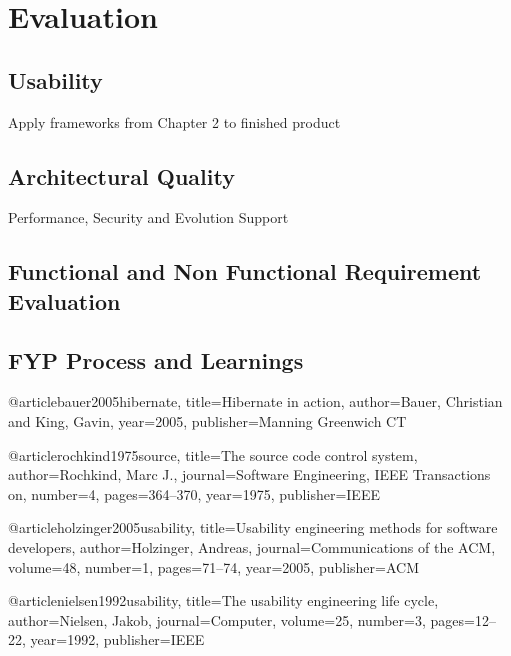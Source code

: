 \chapter{Evaluation}
\label{evaluation}

\section{Usability}

Apply frameworks from Chapter 2 to finished product

\section{Architectural Quality}

Performance, Security and Evolution Support

\section{Functional and Non Functional Requirement Evaluation}

\section{FYP Process and Learnings}

@article{bauer2005hibernate,
  title={Hibernate in action},
  author={Bauer, Christian and King, Gavin},
  year={2005},
  publisher={Manning Greenwich CT}
}

@article{rochkind1975source,
  title={The source code control system},
  author={Rochkind, Marc J.},
  journal={Software Engineering, IEEE Transactions on},
  number={4},
  pages={364--370},
  year={1975},
  publisher={IEEE}
}

@article{holzinger2005usability,
  title={Usability engineering methods for software developers},
  author={Holzinger, Andreas},
  journal={Communications of the ACM},
  volume={48},
  number={1},
  pages={71--74},
  year={2005},
  publisher={ACM}
}

@article{nielsen1992usability,
  title={The usability engineering life cycle},
  author={Nielsen, Jakob},
  journal={Computer},
  volume={25},
  number={3},
  pages={12--22},
  year={1992},
  publisher={IEEE}
}

